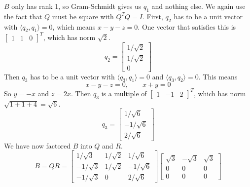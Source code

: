 \documentclass[11pt]{article}
\begin{document}
\noindent $B$ only has rank 1, so Gram-Schmidt gives us $q_1$ and nothing else. We again use the fact that $Q$ must be square with $Q^TQ = I$. First, $q_2$ has to be a unit vector with $\langle q_2,q_1\rangle = 0$, which means $x-y-z=0$. One vector that satisfies this is $\begin{bmatrix} 1&1&0 \end{bmatrix}^T$, which has norm $\sqrt2$.
$$
q_2 = \begin{bmatrix}
    1/\sqrt2\\1/\sqrt2\\0
\end{bmatrix}
$$
Then $q_3$ has to be a unit vector with $\langle q_3,q_1\rangle = 0$ and $\langle q_3,q_2\rangle = 0$. This means
$$
x-y-z=0, \qquad x+y=0
$$
So $y=-x$ and $z=2x$. Then $q_3$ is a multiple of $\begin{bmatrix} 1&-1&2 \end{bmatrix}^T$, which has norm $\sqrt{1+1+4}=\sqrt6$.
$$
q_3 = \begin{bmatrix}
    1/\sqrt6\\-1/\sqrt6\\2/\sqrt6
\end{bmatrix}
$$
We have now factored $B$ into $Q$ and $R$.
$$
B=QR=\begin{bmatrix}
1/\sqrt3 &1/\sqrt2&1/\sqrt6\\
-1/\sqrt3 & 1/\sqrt2 &-1/\sqrt6\\
-1/\sqrt3 & 0 &2/\sqrt6
\end{bmatrix}
\begin{bmatrix}
    \sqrt3&-\sqrt3&\sqrt3\\
    0&0&0\\
    0&0&0
\end{bmatrix}
$$
\end{document}
